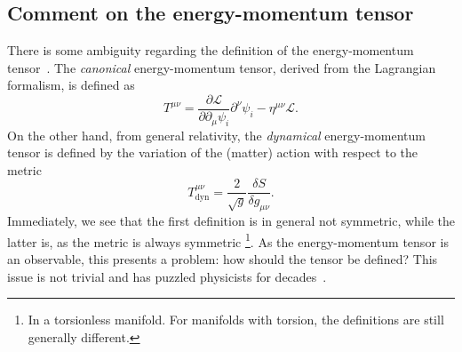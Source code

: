 \subsection{Comment on the energy-momentum tensor}\label{sec:commen-T}
There is some ambiguity regarding the definition of the energy-momentum tensor~\cites{kachelriessQuantumFieldsHubble2018}{chernodubThermalTransportGeometry2021}{vanderwurffMagnetovorticalThermoelectricTransport2019}{forgerCurrentsEnergyMomentumTensor2004}.
The \emph{canonical} energy-momentum tensor, derived from the Lagrangian formalism, is defined as
\begin{equation}
	T^{\mu \nu } = \frac{\partial \mathcal{L}}{\partial \partial _{\mu } \psi_i } \partial ^{\nu } \psi_i - \eta^{\mu \nu } \mathcal{L}.
\end{equation}
On the other hand, from general relativity, the \emph{dynamical} energy-momentum tensor is defined by the variation of the (matter) action with respect to the metric~\cite{kachelriessQuantumFieldsHubble2018}
\begin{equation}
	T_{\text{dyn}}^{\mu \nu} = \frac{2}{\sqrt{g} } \frac{\delta S}{\delta g_{\mu \nu}}.
\end{equation}
Immediately, we see that the first definition is in general not symmetric, while the latter is, as the metric is always symmetric%
\footnote{In a torsionless manifold. For manifolds with torsion, the definitions are still generally different.}.
As the energy-momentum tensor is an observable, this presents a problem:
how should the tensor be defined?
This issue is not trivial and has puzzled physicists for decades~\cite{forgerCurrentsEnergyMomentumTensor2004}.

